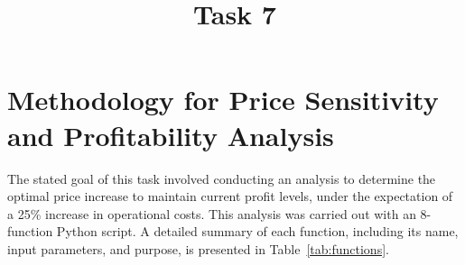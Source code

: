 \documentclass[a4paper,12pt]{article}
\begin{document}
\title{Task 7}
\author{}
\date{}
\maketitle

\section *{\centering Methodology for Price Sensitivity and Profitability Analysis}

The stated goal of this task involved conducting an analysis to determine the optimal price increase to maintain current profit levels, under the expectation of a 25\% increase in operational costs. This analysis was carried out with an 8-function Python script. A detailed summary of each function, including its name, input parameters, and purpose, is presented in Table~\ref{tab:functions}.
\end{document}
